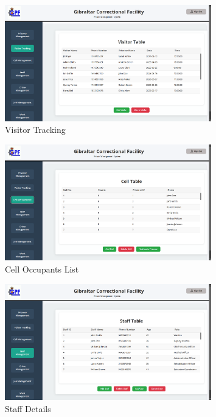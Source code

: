     \begin{figure}[H]
        \centering
        \includegraphics[width=0.8\textwidth]{screenshots/visitor.png}
        \caption{Visitor Tracking}
        \label{fig:visitor}
    \end{figure}
    \begin{figure}[H]
        \centering
        \includegraphics[width=0.8\textwidth]{screenshots/cells.png}
        \caption{Cell Occupants List}
        \label{fig:cells}
    \end{figure}
    \begin{figure}[H]
        \centering
        \includegraphics[width=0.8\textwidth]{screenshots/staff.png}
        \caption{Staff Details}
        \label{fig:staff}
    \end{figure}
